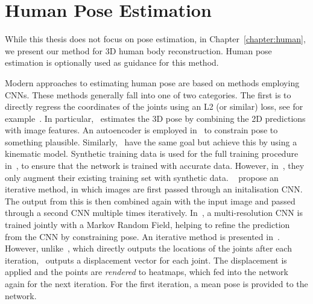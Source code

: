 \section{Human Pose Estimation}

While this thesis does not focus on pose estimation, in
Chapter~\ref{chapter:human}, we present our method for 3D human body
reconstruction. Human pose estimation is optionally used as guidance
for this method.

Modern approaches to estimating human pose are based on methods
employing CNNs. These methods generally fall into one of two
categories. The first is to directly regress the coordinates of the
joints using an L2 (or similar) loss, see for
example~\cite{li20143d,park20163d,tekin2016structured,tekin2016direct,zhou2016deep,chen2016synthesizing,ghezelghieh2016learning,toshev2014deeppose,tompson2014joint}. In
particular,~\cite{park20163d} estimates the 3D pose by combining the
2D predictions with image features. An autoencoder is employed
in~\cite{tekin2016structured} to constrain pose to something
plausible. Similarly,~\cite{zhou2016deep} have the same goal but
achieve this by using a kinematic model. Synthetic training data is
used for the full training procedure in~\cite{chen2016synthesizing},
to ensure that the network is trained with accurate data. However,
in~\cite{ghezelghieh2016learning}, they only augment their existing
training set with synthetic data. ~\cite{toshev2014deeppose} propose
an iterative method, in which images are first passed through an
initalisation CNN. The output from this is then combined again with
the input image and passed through a second CNN multiple times
iteratively.  In~\cite{tompson2014joint}, a multi-resolution CNN is
trained jointly with a Markov Random Field, helping to refine the
prediction from the CNN by constraining pose. An iterative method is
presented in~\cite{carreira2016human}. However,
unlike~\cite{toshev2014deeppose}, which directly outputs the locations
of the joints after each iteration,~\cite{carreira2016human} outputs a
displacement vector for each joint. The displacement is applied and
the points are \textit{rendered} to heatmaps, which fed into the
network again for the next iteration. For the first iteration, a mean
pose is provided to the network.

